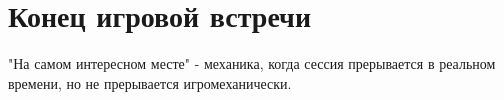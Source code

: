 \section{Конец игровой встречи}




"На самом интересном месте" - механика, когда сессия прерывается в реальном времени, но не прерывается игромеханически.